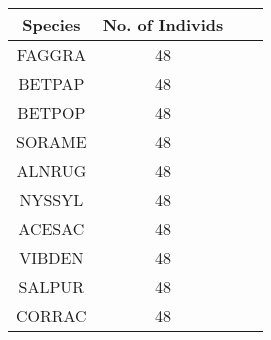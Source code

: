 \documentclass{article}\usepackage[]{graphicx}\usepackage[]{color}
\begin{document}
\newpage
\begin{center}
\label{tab:exp1} 
\footnotesize
\begin{tabular}{|c | c | c | c |}
\hline
\textbf{Species} & \textbf{No. of Individs} \\
\hline
FAGGRA & 48  \\
\hline
BETPAP & 48 \\
\hline
BETPOP & 48 \\
\hline
SORAME & 48 \\
\hline
ALNRUG & 48 \\
\hline
NYSSYL & 48 \\
\hline
ACESAC & 48 \\
\hline
VIBDEN & 48 \\
\hline
SALPUR & 48 \\
\hline
CORRAC & 48 \\
\hline
\end{tabular}
\end{center}
\end{document}
